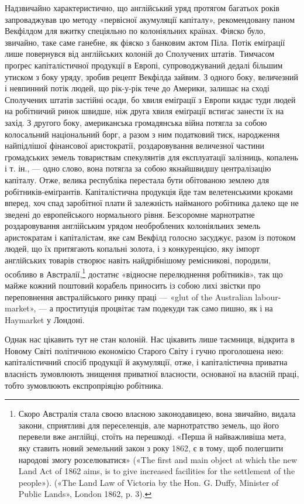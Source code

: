 Надзвичайно характеристично, що англійський уряд протягом багатьох років запроваджував цю методу
«первісної акумуляції капіталу», рекомендовану паном Векфілдом для вжитку спеціяльно по колоніяльних
країнах. Фіяско було, звичайно, таке саме ганебне, як фіяско з банковим актом Піла. Потік еміґрації
лише повернувся від англійських колоній до Сполучених штатів. Тимчасом проґрес капіталістичної
продукції в Европі, супроводжуваний дедалі більшим утиском з боку уряду, зробив рецепт Векфілда
зайвим. З одного боку, величезний і невпинний потік людей, що рік-у-рік тече до Америки, залишає на
сході Сполучених штатів застійні осади, бо хвиля еміґрації з Европи кидає туди людей на робітничий
ринок швидше, ніж друга хвиля еміґрації встигає занести їх на захід. З другого боку, американська
громадянська війна потягла за собою колосальний національний борг, а разом з ним податковий тиск,
народження найпідлішої фінансової аристократії, роздаровування величезної частини громадських земель
товариствам спекулянтів для експлуатації залізниць, копалень і т. ін., — одно слово, вона потягла за
собою якнайшвидшу централізацію капіталу. Отже, велика республіка перестала бути обітованою землею
для робітників-еміґрантів. Капіталістична продукція йде там велетенськими кроками вперед, хоч спад
заробітної плати й залежність найманого робітника далеко ще не зведені до европейського нормального
рівня. Безсоромне марнотратне роздаровування англійським урядом необроблених колоніяльних земель
аристократам і капіталістам, яке сам Векфілд голосно засуджує, разом із потоком людей, що їх
притягають копальні золота, і з конкуренцією, яку імпорт англійських товарів створює навіть
найдрібнішому ремісникові, породили, особливо в Австралії,\footnote{
Скоро Австралія стала своєю власною законодавицею, вона звичайно, видала закони, сприятливі для
переселенців, але марнотратство земель, що його перевели вже англійці, стоїть на перешкоді. «Перша й
найважливіша мета, яку ставить новий земельний закон з року
1862, є в тому, щоб полегшити народові змогу розселюватися» («The first and main object at which the
new Land Act of 1862 aims, is to give increased facilities for the settlement of the people»). («The
Land Law of Victoria by the Hon. G. Duffy, Minister of Public Lands», London 1862, p. 3).
} достатнє «відносне перелюднення
робітників», так що майже кожний поштовий корабель приносить із собою лихі звістки про
переповнення австралійського ринку праці — «glut of the Australian labour-market», — а проституція
процвітає там подекуди так само пишно, як і на Haymarket у Лондоні.

Однак нас цікавить тут не стан колоній. Нас цікавить лише таємниця, відкрита в Новому Світі
політичною економією Старого Світу і гучно проголошена нею: капіталістичний спосіб продукції й
акумуляції, отже, і капіталістична приватна власність зумовлюють знищення приватної власности,
основаної на власній праці, тобто зумовлюють експропріяцію робітника.
